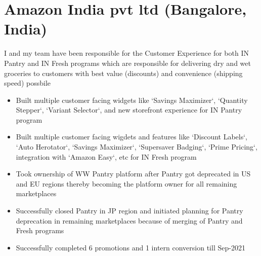 \documentclass[11pt,a4paper,sans]{moderncv} %
\begin{document}
\newpage{}
\section{Amazon India pvt ltd (Bangalore, India)}
         {I and my team have been responsible for the Customer Experience for both IN Pantry and IN Fresh programs which are responsible for delivering dry and wet groceries to customers with best value (discounts) and convenience (shipping speed) possbile
           \begin{itemize}
           \item Built multiple customer facing widgets like `Savings Maximizer`, `Quantity Stepper`, `Variant Selector`, and new storefront experience for IN Pantry program
           \item Built multiple customer facing wigdets and features like `Discount Labels`, `Auto Herotator`, `Savings Maximizer`, `Supersaver Badging`, `Prime Pricing`, integration with `Amazon Easy`, etc for IN Fresh program
           \item Took ownership of WW Pantry platform after Pantry got deprecated in US and EU regions thereby becoming the platform owner for all remaining marketplaces
           \item Successfully closed Pantry in JP region and initiated planning for Pantry deprecation in remaining marketplaces because of merging of Pantry and Fresh programs
           \item Successfully completed 6 promotions and 1 intern conversion till Sep-2021
         \end{itemize}}
\end{document}

